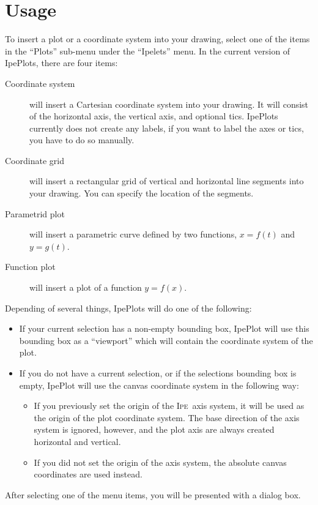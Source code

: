 \documentclass{article}
\def\Ipe{\textsc{Ipe}}
\begin{document}
\section{Usage}
To insert a plot or a coordinate system into your drawing, select one of the
items in the ``Plots'' sub-menu under the ``Ipelets'' menu.  In the current
version of IpePlots, there are four items:
\begin{description}
   \item[Coordinate system] will insert a Cartesian coordinate system into your
      drawing.  It will consist of the horizontal axis, the vertical axis, and
      optional tics.  IpePlots currently does not create any labels, if you
      want to label the axes or tics, you have to do so manually.
   \item[Coordinate grid] will insert a rectangular grid of vertical and
      horizontal line segments into your drawing.  You can specify the location
      of the segments. 
   \item[Parametrid plot] will insert a parametric curve defined by two
      functions, $x = f(t)$ and $y = g(t)$.
   \item[Function plot] will insert a plot of a function $y = f(x)$. 
\end{description}
Depending of several things, IpePlots will do one of the following:
\begin{itemize}
   \item If your current selection has a non-empty bounding box, IpePlot will
      use this bounding box as a ``viewport'' which will contain the coordinate
      system of the plot.
   \item If you do not have a current selection, or if the selections bounding
      box is empty, IpePlot will use the canvas coordinate system in the
      following way:
      \begin{itemize}
	 \item If you previously set the origin of the \Ipe\ axis system, it
	    will be used as the origin of the plot coordinate system.  The
	    base direction of the axis system is ignored, however, and the plot
	    axis are always created horizontal and vertical. 
	 \item If you did not set the origin of the axis system, the absolute
	    canvas coordinates are used instead. 
      \end{itemize}
\end{itemize}

After selecting one of the menu items, you will be presented with a dialog box. 
\end{document}
